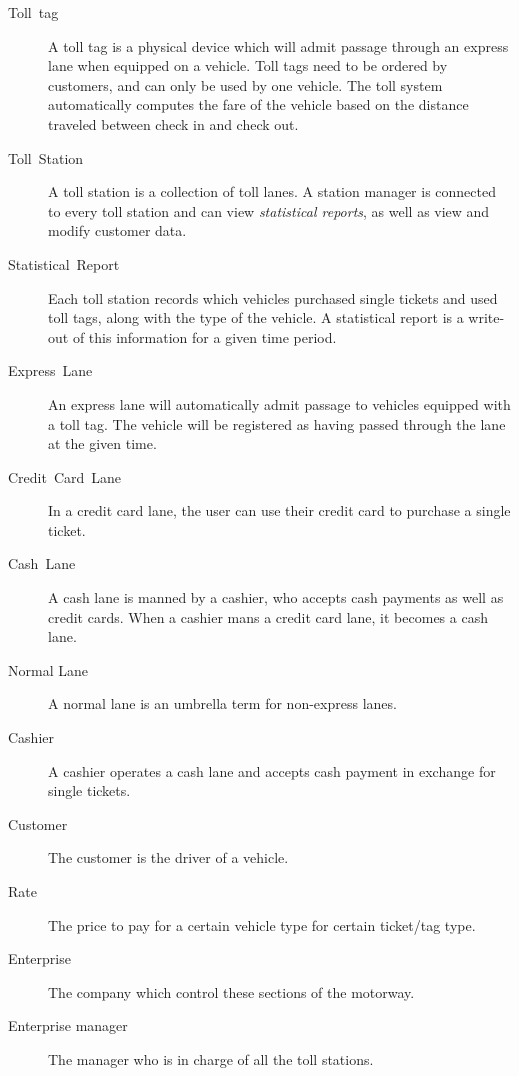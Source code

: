 \begin{description}
\item [{Toll~tag}] A toll tag is a physical device which will admit passage
through an express lane when equipped on a vehicle. Toll tags need
to be ordered by customers, and can only be used by one vehicle. The
toll system automatically computes the fare of the vehicle based on
the distance traveled between check in and check out.

\item [{Toll~Station}] A toll station is a collection of toll lanes. A
station manager is connected to every toll station and can view \emph{statistical
reports}, as well as view and modify customer data.

\item [{Statistical~Report}] Each toll station records which vehicles
purchased single tickets and used toll tags, along with the type of
the vehicle. A statistical report is a write-out of this information
for a given time period.

\item [{Express~Lane}] An express lane will automatically admit passage
to vehicles equipped with a toll tag. The vehicle will be registered
as having passed through the lane at the given time.

\item [{Credit~Card~Lane}] In a credit card lane, the user can use their
credit card to purchase a single ticket.

\item [{Cash~Lane}] A cash lane is manned by a cashier, who accepts cash
payments as well as credit cards. When a cashier mans a credit card
lane, it becomes a cash lane.

\item [{Normal Lane}] A normal lane is an umbrella term for non-express lanes.

\item [{Cashier}] A cashier operates a cash lane and accepts cash payment
in exchange for single tickets.

\item [{Customer}] The customer is the driver of a vehicle.

\item [{Rate}] The price to pay for a certain vehicle type for certain ticket/tag type.

\item [{Enterprise}] The company which control these sections of the motorway.

\item [{Enterprise manager}] The manager who is in charge of all the toll stations.

\end{description}
